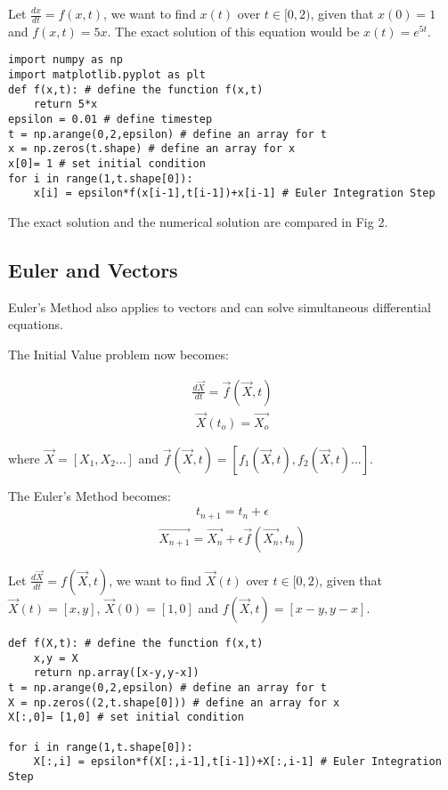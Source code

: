 \documentclass[10pt,letterpaper]{article}
\begin{document}
Let $\frac{dx}{dt}=f(x,t)$, we want to find $x(t)$ over $t\in[0,2)$, given that $x(0)=1$ and $f(x,t) = 5x$. The exact solution of this equation would be $x(t) = e^{5t}$.

\begin{verbatim}
import numpy as np
import matplotlib.pyplot as plt
def f(x,t): # define the function f(x,t)
    return 5*x
epsilon = 0.01 # define timestep
t = np.arange(0,2,epsilon) # define an array for t
x = np.zeros(t.shape) # define an array for x
x[0]= 1 # set initial condition
for i in range(1,t.shape[0]):
    x[i] = epsilon*f(x[i-1],t[i-1])+x[i-1] # Euler Integration Step
\end{verbatim}

The exact solution and the numerical solution are compared in Fig 2.

\subsection*{Euler and Vectors}

Euler's Method also applies to vectors and can solve simultaneous differential equations.

The Initial Value problem now becomes:

\begin{eqnarray}\frac{d\vec{X}}{dt} = \vec{f}(\vec{X}, t)\end{eqnarray}
\begin{eqnarray}\vec{X}(t_o) = \vec{X_o}\end{eqnarray}

where $\vec{X}=[X_1,X_2...]$ and $\vec{f}(\vec{X}, t)=[f_1(\vec{X}, t),f_2(\vec{X}, t)...]$.

The Euler's Method becomes:
\begin{eqnarray}t_{n+1} = t_n + \epsilon \end{eqnarray}
\begin{eqnarray}\vec{X_{n+1}} = \vec{X_n} + \epsilon \vec{f}(\vec{X_n}, t_n)\end{eqnarray}

Let $\frac{d\vec{X}}{dt}=f(\vec{X},t)$, we want to find $\vec{X}(t)$ over $t\in[0,2)$, given that $\vec{X}(t)=[x,y]$, $\vec{X}(0)=[1,0]$ and $f(\vec{X},t) = [x-y,y-x]$.

\begin{verbatim}
def f(X,t): # define the function f(x,t)
    x,y = X
    return np.array([x-y,y-x])
t = np.arange(0,2,epsilon) # define an array for t
X = np.zeros((2,t.shape[0])) # define an array for x
X[:,0]= [1,0] # set initial condition

for i in range(1,t.shape[0]):
    X[:,i] = epsilon*f(X[:,i-1],t[i-1])+X[:,i-1] # Euler Integration Step
\end{verbatim}
\end{document}

